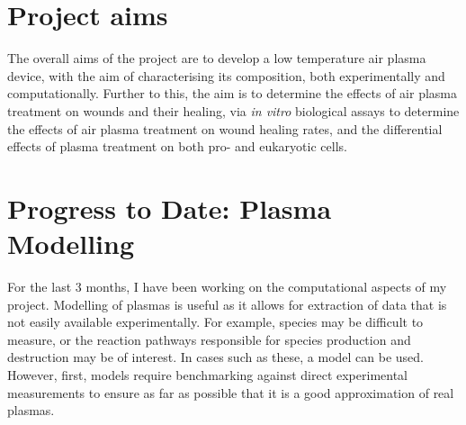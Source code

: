 \documentclass[11pt, oneside]{article}   	%
\begin{document}
\section{Project aims}

The overall aims of the project are to develop a low temperature air plasma device, with the aim of characterising its composition, both experimentally and computationally.
Further to this, the aim is to determine the effects of air plasma treatment on wounds and their healing, via \textit{in vitro} biological assays to determine the effects of air plasma treatment on wound healing rates, and the differential effects of plasma treatment on both pro- and eukaryotic cells.


\section{Progress to Date: Plasma Modelling}
For the last 3 months, I have been working on the computational aspects of my project.
Modelling of plasmas is useful as it allows for extraction of data that is not easily available experimentally. 
For example, species may be difficult to measure, or the reaction pathways responsible for species production and destruction may be of interest.
In cases such as these, a model can be used.
However, first, models require benchmarking against direct experimental measurements to ensure as far as possible that it is a good approximation of real plasmas.
\end{document}
